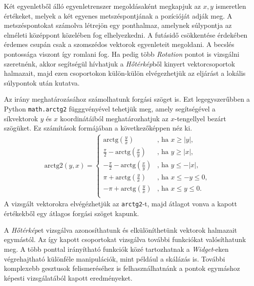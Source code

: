 Két egyenletből álló egyenletrenszer megoldásaként megkapjuk az $x, y$ ismeretlen értékeket, melyek a két egyenes metszéspontjának a pozícióját adják meg.
A metszéspontokat számolva létrejön egy ponthalmaz, amelynek súlypontja az elméleti középpont közelében fog elhelyezkedni. A futásidő csökkentése érdekében érdemes csupán csak a szomszédos vektorok egyenleteit megoldani. A becslés pontossága viszont így romlani fog.
Ha pedig több \textit{Rotation} pontot is vizsgálni szeretnénk, akkor segítségül hívhatjuk a \textit{Hőtérkép}ből kinyert vektorcsoportok halmazait, majd ezen csoportokon külön-külön elvégezhetjük az eljárást a lokális súlypontok után kutatva.

Az irány meghatározásához számolhatunk forgási szöget is. Ezt legegyszerűbben a Python \texttt{math.arctg2} függgvényével tehetjük meg, amely segítségével a síkvektorok $y$ és $x$ koordinátáiból meghatározhatjuk az $x$-tengellyel bezárt szögüket. Ez számítások formájában a következőképpen néz ki.
\begin{align*}
		\text{arctg2$(y,x)$} =
  			\begin{cases}
    			\text{arctg$\left(\frac{y}{x}\right)$} & \text{, ha $x\geq \vert y \vert$,} \\
    			\frac{\pi}{2}-\text{arctg$\left(\frac{x}{y}\right)$} & \text{, ha $y\geq \vert x \vert$,}\\
    			-\frac{\pi}{2}-\text{arctg$\left(\frac{x}{y}\right)$} & \text{, ha $y\leq -\vert x \vert$,}\\
    			\pi+\text{arctg$\left(\frac{y}{x}\right)$} & \text{, ha $x \leq -y \leq 0$,}\\
    			-\pi+\text{arctg$\left(\frac{y}{x}\right)$} & \text{, ha $x \leq y \leq 0$}.\\
  			\end{cases}
\end{align*}
A vizsgált vektorokra elvégézhetjük az \texttt{arctg2}-t, majd átlagot vonva a kapott értékekből egy átlagos forgási szöget kapunk.


A \textit{Hőtérkép}et vizsgálva azonosíthatunk és elkülöníthetünk vektorok halmazait egymástól. Az így kapott csoportokat vizsgálva további funkciókat valósíthatunk meg. A több ponttal irányítható funkciók közé tartozhatnak a \textit{Widget}-eken végrehajtható különféle manipulációk, mint például a skálázás is. További komplexebb gesztusok felismeréséhez is felhasználhatnánk a pontok egymáshoz képesti vizsgálatából kapott eredményeket.

